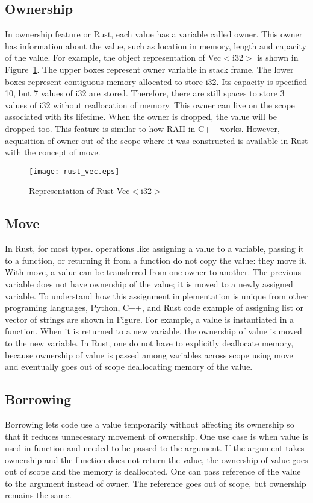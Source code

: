 \subsection{Ownership}
In ownership feature or Rust, each value has a variable called owner.
This owner has information about the value, such as location in memory, length and capacity of the value. 
For example, the object representation of Vec$<$i32$>$ is shown in Figure~\ref{fig:rustvec}. The upper boxes represent owner variable in stack frame. 
The lower boxes represent contiguous memory allocated to store i32. Its capacity is specified 10, but 7 values of i32 are stored. 
Therefore, there are still spaces to store 3 values of i32 without reallocation of memory. This owner can live on the scope associated with its lifetime.
When the owner is dropped, the value will be dropped too. This feature is similar to how RAII in C++ works. 
However, acquisition of owner out of the scope where it was constructed is available in Rust with the concept of move. 

\begin{figure}[htb]
    \texttt{[image: rust\_vec.eps]}
    \caption{Representation of Rust Vec$<$i32$>$}
    \label{fig:rustvec}
\end{figure}



\subsection{Move}
In Rust, for most types. operations like assigning a value to a variable, passing it to a function, or returning it from a function do not copy the value: they move it. 
With move, a value can be transferred from one owner to another. The previous variable does not have ownership of the value; it is moved to a newly assigned variable. 
To understand how this assignment implementation is unique from other programing languages, Python, C++, and Rust code example of assigning list or vector of strings are shown in Figure. 
For example, a value is instantiated in a function. 
When it is returned to a new variable, the ownership of value is moved to the new variable. In Rust, one do not have to explicitly deallocate memory, 
because ownership of value is passed among variables across scope using move and eventually goes out of scope deallocating memory of the value.

\subsection{Borrowing}
Borrowing lets code use a value temporarily without affecting its ownership so that it reduces unnecessary movement of ownership. 
One use case is when value is used in function and needed to be passed to the argument. If the argument takes ownership and the function does not return the value, 
the ownership of value goes out of scope and the memory is deallocated. One can pass reference of the value to the argument instead of owner. 
The reference goes out of scope, but ownership remains the same. 



